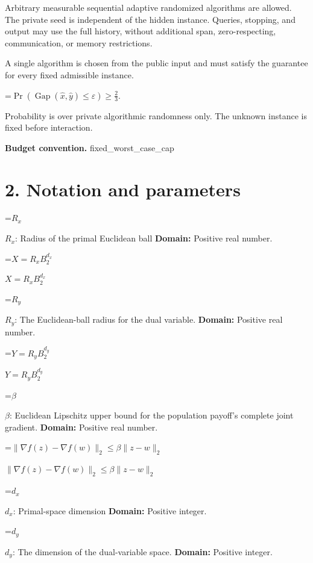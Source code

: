 \documentclass[10pt,a4paper]{article}
\newcommand{\AtlasMath}[1]{\par\begingroup\centering\setbox0=\hbox{$\displaystyle #1$}\ifdim\wd0>1.4\linewidth\typeout{ATLAS WIDE FORMULA: \the\wd0}\fi\ifdim\wd0>\linewidth\resizebox{\linewidth}{!}{\box0}\else\box0\fi\par\endgroup}
\newcommand{\AtlasInlineMath}[1]{\begingroup\setbox0=\hbox{$#1$}\ifdim\wd0>.4\linewidth\endgroup\AtlasMath{#1}\else\endgroup$#1$\fi}
\begin{document}
Arbitrary measurable sequential adaptive randomized algorithms are allowed. The private seed is independent of the hidden instance. Queries, stopping, and output may use the full history, without additional span, zero-respecting, communication, or memory restrictions.



A single algorithm is chosen from the public input and must satisfy the guarantee for every fixed admissible instance.




\AtlasMath{\Pr\!\left(\operatorname{Gap}(\widehat{x},\widehat{y})\le\varepsilon\right)\ge\frac23.}




Probability is over private algorithmic randomness only. The unknown instance is fixed before interaction.



\textbf{Budget convention.} fixed\_worst\_case\_cap



\section{2. Notation and parameters}


\AtlasInlineMath{R_x}: Radius of the primal Euclidean ball \textbf{Domain:} Positive real number.



\AtlasInlineMath{X=R_xB_2^{d_x}}



\AtlasInlineMath{R_y}: The Euclidean-ball radius for the dual variable. \textbf{Domain:} Positive real number.



\AtlasInlineMath{Y=R_yB_2^{d_y}}



\AtlasInlineMath{\beta}: Euclidean Lipschitz upper bound for the population payoff's complete joint gradient. \textbf{Domain:} Positive real number.



\AtlasInlineMath{\|\nabla f(z)-\nabla f(w)\|_2\le\beta\|z-w\|_2}



\AtlasInlineMath{d_x}: Primal-space dimension \textbf{Domain:} Positive integer.



\AtlasInlineMath{d_y}: The dimension of the dual-variable space. \textbf{Domain:} Positive integer.
\end{document}
